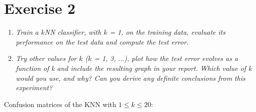 \documentclass[a4paper,11pt]{article}
\begin{document}


\section*{Exercise 2}
\begin{enumerate}
\item \textit{Train a $k$NN classifier, with $k$ = 1, on the training data, evaluate its performance on the test data and
compute the test error.}
\item \textit{Try other values for $k$ ($k$ = 1, 3, $\ldots$), plot how the test error evolves as a function of k and include the
resulting graph in your report. Which value of k would you use, and why? Can you derive any definite
conclusions from this experiment?
}

\end{enumerate}

\label{sec:two}
Confusion matrices of the KNN with $1 \leq k \leq 20$:
\end{document}
